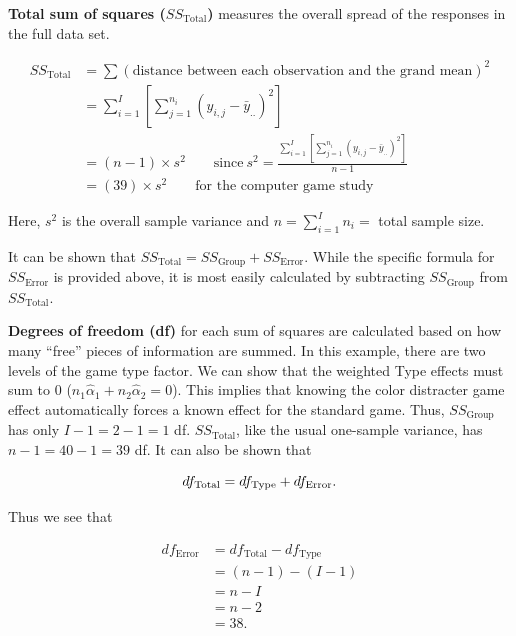 \documentclass[
]{book}
\begin{document}
\textbf{Total sum of squares (\(SS_{\text{Total}}\))} measures the overall spread of the responses in the full data set.

\begin{equation}
\label{2_12}
\begin{split}
SS_{\text{Total}} &= \sum (\text{distance between each observation and the grand mean})^2 \\
&= \sum_{i=1}^{I} \left[ \sum_{j=1}^{n_i} (y_{i,j} - \bar{y}_{..})^2 \right] \\
&= (n - 1) \times s^2 \qquad \text{since} \ s^2 = \frac{ \sum_{i=1}^{I} \left[ \sum_{j=1}^{n_i} (y_{i,j} - \bar{y}_{..})^2 \right] }{n - 1} \\
&= (39) \times s^2 \qquad \text{for the computer game study}
\end{split}
\tag{2.12}
\end{equation}

Here, \(s^2\) is the overall sample variance and \(n = \sum_{i=1}^{I} n_i =\) total sample size.

It can be shown that \(SS_{\text{Total}} = SS_{\text{Group}} + SS_{\text{Error}}\). While the specific formula for \(SS_{\text{Error}}\) is provided above, it is most easily calculated by subtracting \(SS_{\text{Group}}\) from \(SS_{\text{Total}}\).

\textbf{Degrees of freedom (df)} for each sum of squares are calculated based on how many ``free'' pieces of information are summed. In this example, there are two levels of the game type factor. We can show that the weighted Type effects must sum to 0 (\(n_1 \hat{\alpha}_1 + n_2 \hat{\alpha}_2 = 0\)). This implies that knowing the color distracter game effect automatically forces a known effect for the standard game. Thus, \(SS_{\text{Group}}\) has only \(I - 1 = 2 - 1 = 1\) df. \(SS_{\text{Total}}\), like the usual one-sample variance, has \(n - 1 = 40 - 1 = 39\) df. It can also be shown that

\begin{equation}
df_{\text{Total}} = df_{\text{Type}} + df_{\text{Error}}.
\notag
\end{equation}

Thus we see that

\begin{align*}
df_{\text{Error}} 
&= df_{\text{Total}} - df_{\text{Type}} \\
&= (n - 1) - (I - 1) \\
&= n - I \\
&= n - 2 \\
&= 38.
\end{align*}
\end{document}
